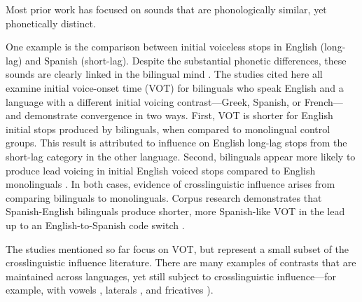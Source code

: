Most prior work has focused on sounds that are phonologically similar, yet phonetically distinct.

One example is the comparison between initial voiceless stops in English (long-lag) and Spanish (short-lag). Despite the substantial phonetic differences, these sounds are clearly linked in the bilingual mind \citep{fricke_2016_phonetic, antoniou_2010_context, goldrick_2014_switching, sundara_2006_production}. The studies cited here all examine initial voice-onset time (VOT) for bilinguals who speak English and a language with a different initial voicing contrast---Greek, Spanish, or French---and demonstrate convergence in two ways. First, VOT is shorter for English initial stops produced by bilinguals, when compared to monolingual control groups. This result is attributed to influence on English long-lag stops from the short-lag category in the other language. Second, bilinguals appear more likely to produce lead voicing in initial English voiced stops compared to English monolinguals \citep{sundara_2006_production}. In both cases, evidence of crosslinguistic influence arises from comparing bilinguals to monolinguals. Corpus research demonstrates that Spanish-English bilinguals produce shorter, more Spanish-like VOT in the lead up to an English-to-Spanish code switch \citep{fricke_2016_phonetic, bullock_2009_sociophonetics}. 

The studies mentioned so far focus on VOT, but represent a small subset of the crosslinguistic influence literature. There are many examples of contrasts that are maintained across languages, yet still subject to crosslinguistic influence---for example, with vowels \citep{guion_2003_systems}, laterals \citep{amengual_2018_laterals,barlow_2014_aoa}, and fricatives \citep{peng_1993_influence}). %

